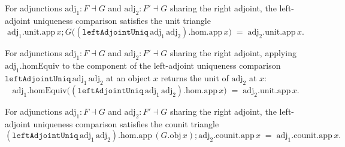 \begin{lemma}
  \label{mk-lem:unit_leftadjointuniq_hom_app}
  \mathlibok

  For adjunctions \(\mathrm{adj}_1 : F \dashv G\) and \(\mathrm{adj}_2 : F' \dashv G\) sharing the
  right adjoint, the left-adjoint uniqueness comparison satisfies the unit triangle
  \[
    \mathrm{adj}_1.\mathrm{unit}.\mathrm{app}\,x
      \mathbin{;} G\bigl((\mathtt{leftAdjointUniq}\,\mathrm{adj}_1\,\mathrm{adj}_2).\mathrm{hom}.\mathrm{app}\,x\bigr)
      \;=\; \mathrm{adj}_2.\mathrm{unit}.\mathrm{app}\,x.
  \]
\end{lemma}

\begin{lemma}
  \label{mk-lem:homequiv_leftadjointuniq_hom_app}
  \mathlibok

  For adjunctions \(\mathrm{adj}_1 : F \dashv G\) and \(\mathrm{adj}_2 : F' \dashv G\) sharing the
  right adjoint, applying \(\mathrm{adj}_1.\mathrm{homEquiv}\) to the component of the left-adjoint
  uniqueness comparison \(\mathtt{leftAdjointUniq}\,\mathrm{adj}_1\,\mathrm{adj}_2\) at an object
  \(x\) returns the unit of \(\mathrm{adj}_2\) at \(x\):
  \[
    \mathrm{adj}_1.\mathrm{homEquiv}\bigl(
      (\mathtt{leftAdjointUniq}\,\mathrm{adj}_1\,\mathrm{adj}_2).\mathrm{hom}.\mathrm{app}\,x\bigr)
      \;=\; \mathrm{adj}_2.\mathrm{unit}.\mathrm{app}\,x.
  \]
\end{lemma}

\begin{lemma}
  \label{mk-lem:leftadjointuniq_hom_app_counit}
  \mathlibok

  For adjunctions \(\mathrm{adj}_1 : F \dashv G\) and \(\mathrm{adj}_2 : F' \dashv G\) sharing the
  right adjoint, the left-adjoint uniqueness comparison satisfies the counit triangle
  \[
    (\mathtt{leftAdjointUniq}\,\mathrm{adj}_1\,\mathrm{adj}_2).\mathrm{hom}.\mathrm{app}\,(G.\mathrm{obj}\,x)
      \mathbin{;} \mathrm{adj}_2.\mathrm{counit}.\mathrm{app}\,x
      \;=\; \mathrm{adj}_1.\mathrm{counit}.\mathrm{app}\,x.
  \]
\end{lemma}

